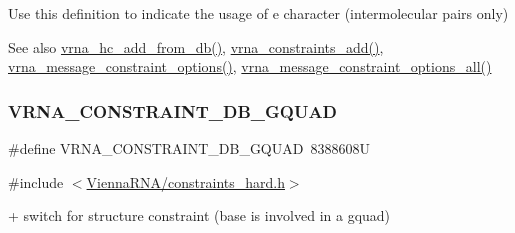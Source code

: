 Use this definition to indicate the usage of \textquotesingle{}e\textquotesingle{} character (intermolecular pairs only)

\begin{DoxySeeAlso}{See also}
\mbox{\hyperlink{group__hard__constraints_ga5b4de3247b67358080c176b94591a8e6}{vrna\+\_\+hc\+\_\+add\+\_\+from\+\_\+db()}}, \mbox{\hyperlink{group__constraints_ga35a401f680969a556858a8dd5f1d07cc}{vrna\+\_\+constraints\+\_\+add()}}, \mbox{\hyperlink{group__constraints_gaa1f20b53bf09ac2e6b0dbb13f7d89670}{vrna\+\_\+message\+\_\+constraint\+\_\+options()}}, \mbox{\hyperlink{group__constraints_gaec7e13fa0465c2acc7a621d1aecb709f}{vrna\+\_\+message\+\_\+constraint\+\_\+options\+\_\+all()}} 
\end{DoxySeeAlso}
\mbox{\label{group__hard__constraints_ga75cfab03cdc97c95b3ce8bb29f52b08e}} 
\subsubsection{\texorpdfstring{V\+R\+N\+A\+\_\+\+C\+O\+N\+S\+T\+R\+A\+I\+N\+T\+\_\+\+D\+B\+\_\+\+G\+Q\+U\+AD}{VRNA\_CONSTRAINT\_DB\_GQUAD}}
{\footnotesize\ttfamily \#define V\+R\+N\+A\+\_\+\+C\+O\+N\+S\+T\+R\+A\+I\+N\+T\+\_\+\+D\+B\+\_\+\+G\+Q\+U\+AD~8388608U}



{\ttfamily \#include $<$\mbox{\hyperlink{constraints__hard_8h}{Vienna\+R\+N\+A/constraints\+\_\+hard.\+h}}$>$}



\textquotesingle{}+\textquotesingle{} switch for structure constraint (base is involved in a gquad) 

